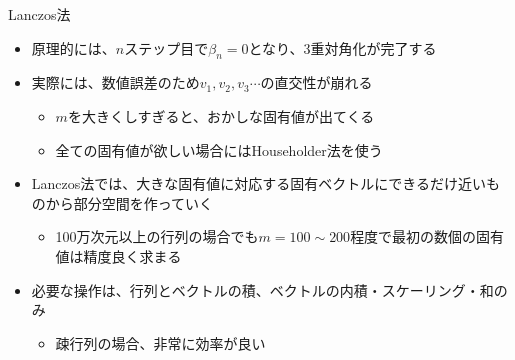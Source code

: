 \begin{frame}[t,fragile]{Lanczos法}
  \begin{itemize}
  \item 原理的には、$n$ステップ目で$\beta_n=0$となり、3重対角化が完了する
  \item 実際には、数値誤差のため$v_1,v_2,v_3\cdots$の直交性が崩れる
    \begin{itemize}
      \item $m$を大きくしすぎると、おかしな固有値が出てくる
      \item 全ての固有値が欲しい場合にはHouseholder法を使う
    \end{itemize}
  \item Lanczos法では、大きな固有値に対応する固有ベクトルにできるだけ近いものから部分空間を作っていく
    \begin{itemize}
      \item 100万次元以上の行列の場合でも$m=100 \sim 200$程度で最初の数個の固有値は精度良く求まる
    \end{itemize}
  \item 必要な操作は、行列とベクトルの積、ベクトルの内積・スケーリング・和のみ
    \begin{itemize}
      \item 疎行列の場合、非常に効率が良い
    \end{itemize}
  \end{itemize}
\end{frame}
